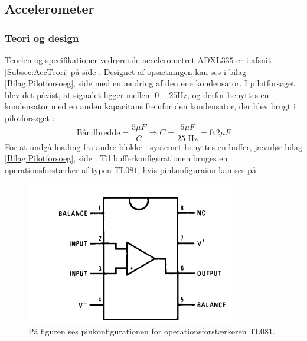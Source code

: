 \subsection{Accelerometer}\label{Acc_afsnit}
\subsubsection{Teori og design}
Teorien og specifikationer vedrørende accelerometret ADXL$335$ er i afsnit \ref{Subsec:AccTeori} på side \pageref{Subsec:AccTeori}. Designet af opsætningen kan ses i bilag \ref{Bilag:Pilotforsoeg}, side \pageref{Bilag:Pilotforsoeg} med en ændring af den ene kondensator. I pilotforsøget blev det påvist, at signalet ligger mellem $0-25$Hz, og derfor benyttes en kondensator med en anden kapacitans fremfor den kondensator, der blev brugt i pilotforsøget \cite{Devices2009}:
\begin{equation}
\text{Båndbredde} = \dfrac{5\mu F}{C} \Rightarrow  C = \dfrac{5\mu F}{\text{25 Hz}} = 0.2\mu F
\end{equation}
For at undgå loading fra andre blokke i systemet benyttes en buffer, jævnfør bilag \ref{Bilag:Pilotforsoeg}, side \pageref{Bilag:Pilotforsoeg}. Til bufferkonfigurationen bruges en operationsforstærker af typen TL$081$, hvis pinkonfiguraion kan ses på . 

\begin{figure}[H]
	\centering
	\includegraphics[scale=.8]{figures/cProblemloesning/TL081.PNG}
	\caption{På figuren ses pinkonfigurationen for operationsforstærkeren TL$081$.\cite{Corporation1995}}
	\label{fig:TL081}
\end{figure}

